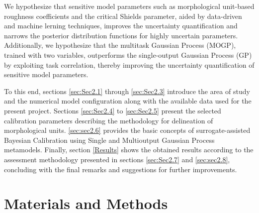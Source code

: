 \documentclass[draft,linenumbers,onecolumn]{agujournal2019} %
\begin{document}
We hypothesize that sensitive model parameters such as morphological unit-based roughness coefficients and the critical Shields parameter, aided by data-driven and machine lerning techniques, improves the uncertainty quantification and narrows the posterior distribution functions for highly uncertain parameters. Additionally, we hypothesize that the multitask Gaussian Process (MOGP), trained with two variables, outperforms the single-output Gaussian Process (GP) by exploiting task correlation, thereby improving the uncertainty quantification of sensitive model parameters.

 
To this end, sections  \ref{sec:Sec2.1} through \ref{sec:Sec2.3} introduce the area of study and the numerical model configuration along with the available data used for the present project. Sections \ref{sec:Sec2.4} to \ref{sec:Sec2.5} present the selected calibration parameters describing the methodology for delineation of morphological units. \ref{sec:sec2.6} provides the basic concepts of surrogate-assisted Bayesian Calibration using Single and Multioutput Gaussian Process metamodels. Finally, section \ref{Results} shows the obtained results according to the assessment methodology presented in sections \ref{sec:Sec2.7} and \ref{sec:sec2.8}, concluding with the final remarks and suggestions for further improvements.


\section{Materials and Methods} 
\label{Materials}
\end{document}
